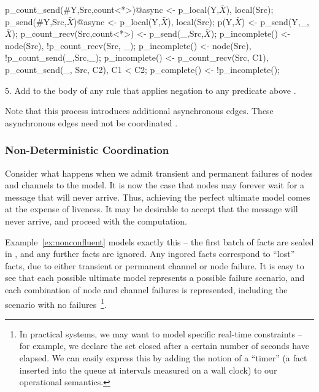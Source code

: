\noindent
\begin{Dedalus}
p_count_send(#Y,Src,count<*>)@async <- p_local(Y,\(\bar{X}\)),
                                       local(Src);
p_send(#Y,Src,\(\bar{X}\))@async <- p_local(Y,\(\bar{X}\)), local(Src);
p(Y,\(\bar{X}\)) <- p_send(Y,_,\(\bar{X}\));
p_count_recv(Src,count<*>) <- p_send(_,Src,\(\bar{X}\));
p_incomplete() <- node(Src), !p_count_recv(Src, _);
p_incomplete() <- node(Src), !p_count_send(_,Src,_);
p_incomplete() <- p_count_recv(Src, C1),
                  p_count_send(_, Src, C2), C1 < C2;
p_complete() <- !p_incomplete();
\end{Dedalus}
5. Add  to the body of any rule that applies negation to any predicate above .

Note that this process introduces additional asynchronous edges.  These asynchronous edges need not be coordinated .


\subsubsection{Non-Deterministic Coordination}

Consider what happens when we admit transient and permanent failures of nodes and channels to the model.  It is now the case that nodes may forever wait for a message that will never arrive.  Thus, achieving the perfect ultimate model comes at the expense of liveness.  It may be desirable to accept that the message will never arrive, and proceed with the computation.

Example~\ref{ex:nonconfluent} models exactly this -- the first batch of  facts are sealed in , and any further  facts are ignored.  Any ingored  facts correspond to ``lost''  facts, due to either transient or permanent channel or node failure.  It is easy to see that each possible ultimate model represents a possible failure scenario, and each combination of node and channel failures is represented, including the scenario with no failures~\footnote{In practical systems, we may want to model specific real-time constraints -- for example, we declare the set closed after a certain number of seconds have elapsed.  We can easily express this by adding the notion of a ``timer'' (a fact inserted into the queue at intervals measured on a wall clock) to our operational semantics.}.

